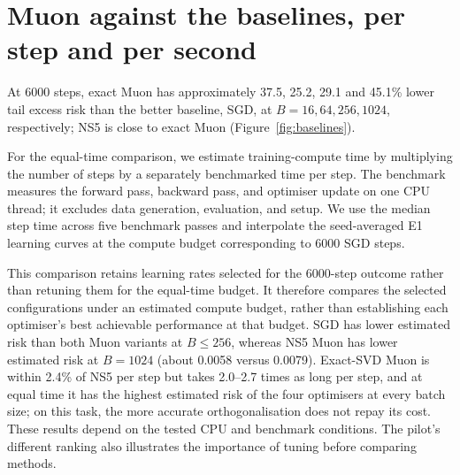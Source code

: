 \documentclass[11pt,a4paper]{article}
\begin{document}
\section{Muon against the baselines, per step and per second}\label{sec:baselines}
At 6000 steps, exact Muon has approximately 37.5, 25.2, 29.1 and 45.1\% lower tail excess risk than the better baseline, SGD, at $B=16,64,256,1024$, respectively; NS5 is close to exact Muon (Figure~\ref{fig:baselines}).

For the equal-time comparison, we estimate training-compute time by multiplying the number of steps by a separately benchmarked time per step. The benchmark measures the forward pass, backward pass, and optimiser update on one CPU thread; it excludes data generation, evaluation, and setup. We use the median step time across five benchmark passes and interpolate the seed-averaged E1 learning curves at the compute budget corresponding to 6000 SGD steps.

This comparison retains learning rates selected for the 6000-step outcome rather than retuning them for the equal-time budget. It therefore compares the selected configurations under an estimated compute budget, rather than establishing each optimiser's best achievable performance at that budget. SGD has lower estimated risk than both Muon variants at $B\leq256$, whereas NS5 Muon has lower estimated risk at $B=1024$ (about 0.0058 versus 0.0079). Exact-SVD Muon is within 2.4\% of NS5 per step but takes 2.0--2.7 times as long per step, and at equal time it has the highest estimated risk of the four optimisers at every batch size; on this task, the more accurate orthogonalisation does not repay its cost. These results depend on the tested CPU and benchmark conditions. The pilot's different ranking also illustrates the importance of tuning before comparing methods.
\end{document}
